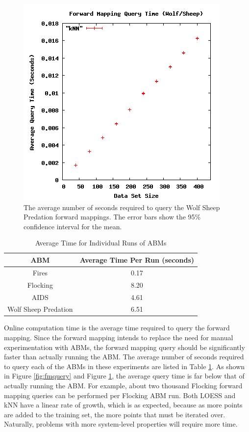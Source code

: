 \begin{figure}[ht]
\centering
\includegraphics[scale=.5]{images/results_wolfsheep/fm-query.png}
\caption{The average number of seconds required to query the Wolf Sheep Predation forward mappings.
The error bars show the 95\% confidence interval for the mean.}
\label{fig:wolfsheepfmquery}
\end{figure}


\begin{table}[ht]
  \caption{Average Time for Individual Runs of ABMs}
  \centering
  \begin{tabular}{c c}
    \hline \hline
    ABM & Average Time Per Run (seconds)\\
    \hline
    Fires & 0.17\\
    Flocking & 8.20\\
    AIDS & 4.61\\
    Wolf Sheep Predation & 6.51\\
    \hline
  \end{tabular}
  \label{table:runtimes}
\end{table}


Online computation time is the average time required to query the forward mapping.
Since the forward mapping intends to replace the need for manual experimentation with ABMs, the forward mapping query should be significantly faster than actually running the ABM.
The average number of seconds required to query each of the ABMs in these experiments are listed in Table \ref{table:runtimes}.
As shown in Figure \ref{fig:fmquery} and Figure \ref{fig:wolfsheepfmquery}, the average query time is far below that of actually running the ABM.
For example, about two thousand Flocking forward mapping queries can be performed per Flocking ABM run.
Both LOESS and kNN have a linear rate of growth, which is as expected, because as more points are added to the training set, the more points that must be iterated over.
Naturally, problems with more system-level properties will require more time.

